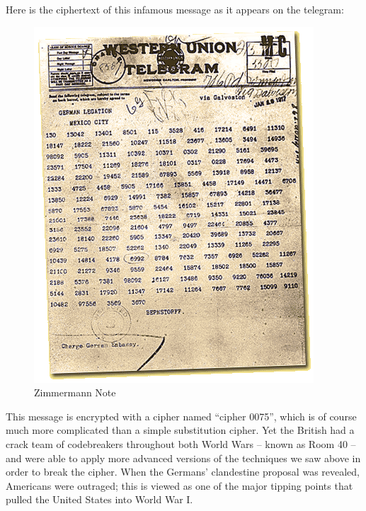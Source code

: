 \documentclass[UTF8]{book}
\begin{document}
\begin{CJK}{UTF8}{gbsn}
Here is the ciphertext of this infamous message as it appears on the telegram:

\begin{figure}[H]
\centering
\includegraphics[width=0.8\linewidth]{zimmermann}
\caption{Zimmermann Note}
\end{figure}

This message is encrypted with a cipher named ``cipher 0075'', which is of course much more complicated than a simple substitution cipher. Yet the British had a crack team of codebreakers throughout both World Wars – known as Room 40 – and were able to apply more advanced versions of the techniques we saw above in order to break the cipher. When the Germans' clandestine proposal was revealed, Americans were outraged; this is viewed as one of the major tipping points that pulled the United States into World War I.


\end{CJK}
\end{document}
